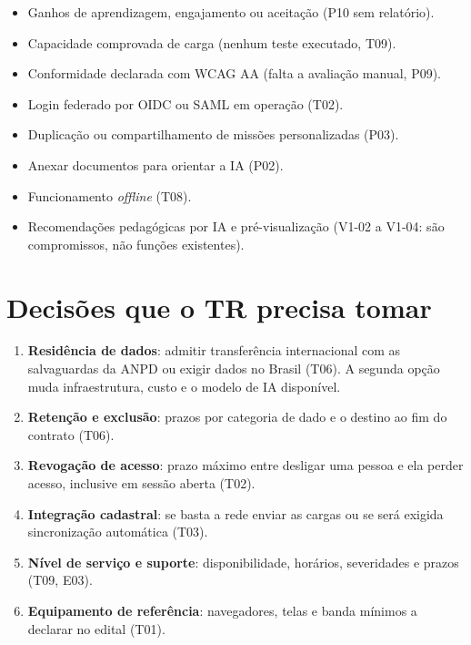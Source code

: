 \begin{limitacao}
\begin{itemize}
  \item Ganhos de aprendizagem, engajamento ou aceitação (P10 sem relatório).
  \item Capacidade comprovada de carga (nenhum teste executado, T09).
  \item Conformidade declarada com WCAG AA (falta a avaliação manual, P09).
  \item Login federado por OIDC ou SAML em operação (T02).
  \item Duplicação ou compartilhamento de missões personalizadas (P03).
  \item Anexar documentos para orientar a IA (P02).
  \item Funcionamento \emph{offline} (T08).
  \item Recomendações pedagógicas por IA e pré-visualização (V1-02 a V1-04:
    são compromissos, não funções existentes).
\end{itemize}
\end{limitacao}

\section{Decisões que o TR precisa tomar}

\begin{decisao}
\begin{enumerate}
  \item \textbf{Residência de dados}: admitir transferência internacional com
    as salvaguardas da ANPD ou exigir dados no Brasil (T06). A segunda opção
    muda infraestrutura, custo e o modelo de IA disponível.
  \item \textbf{Retenção e exclusão}: prazos por categoria de dado e o
    destino ao fim do contrato (T06).
  \item \textbf{Revogação de acesso}: prazo máximo entre desligar uma pessoa e
    ela perder acesso, inclusive em sessão aberta (T02).
  \item \textbf{Integração cadastral}: se basta a rede enviar as cargas ou se
    será exigida sincronização automática (T03).
  \item \textbf{Nível de serviço e suporte}: disponibilidade, horários,
    severidades e prazos (T09, E03).
  \item \textbf{Equipamento de referência}: navegadores, telas e banda mínimos
    a declarar no edital (T01).
\end{enumerate}
\end{decisao}

